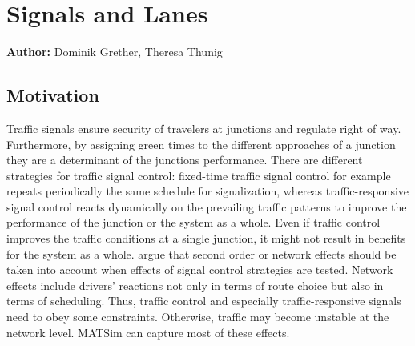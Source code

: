 \chapter{Signals and Lanes}
\label{ch:signalslanes}

\hfill \textbf{Author:} Dominik Grether, Theresa Thunig



\section{Motivation}

Traffic signals ensure security of travelers at junctions and regulate right of way. 
Furthermore, by assigning green times to the different approaches of a junction they are a determinant of the junctions performance. 
There are different strategies for traffic signal control: fixed-time traffic signal control for example repeats periodically the same schedule for signalization, whereas traffic-responsive signal control reacts dynamically on the prevailing traffic patterns to improve the performance of the junction or the system as a whole.   
Even if traffic %
control improves the traffic conditions at a single junction, it might not result in benefits for the system as a whole. 
\citet{Hu1997D2DFlowEvolutionReactiveSignalsDynasmart} argue that
second order or network effects should be taken into account when effects of signal control strategies are tested. Network effects include drivers' reactions not only in terms of route choice but also in terms of scheduling. 
Thus, traffic control and especially traffic-responsive signals need to obey some constraints. Otherwise, traffic may become unstable at the network level. 
MATSim can capture most of these effects. 

